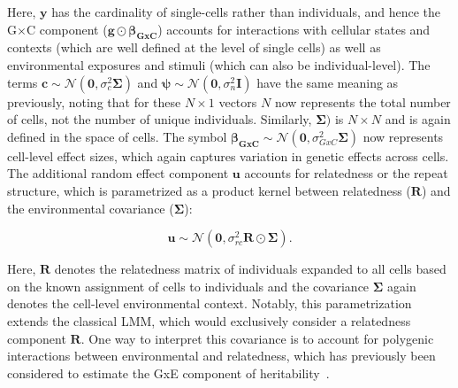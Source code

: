 Here, $\mathbf{y}$ has the cardinality of single-cells rather than individuals, and hence the G$\times$C component ($\mathbf{g} \odot \boldsymbol{\beta_{GxC}}$) accounts for interactions with cellular states and contexts (which are well defined at the level of single cells) as well as environmental exposures and stimuli (which can also be individual-level).
The terms $\mathbf{c} \sim \mathcal{N}(\mathbf{0},\sigma_c^2 \boldsymbol{\Sigma})$ and $\boldsymbol{\psi} \sim \mathcal{N}(\mathbf{0},\sigma_n^2\mathbf{I})$ have the same meaning as previously, noting that for these $N \times 1$ vectors $N$ now represents the total number of cells, not the number of unique individuals.
Similarly, $\boldsymbol{\Sigma})$ is $N \times N$ and is again defined in the space of cells.
The symbol $\boldsymbol{\beta_{GxC}}\sim \mathcal{N}(\mathbf{0},\sigma_{GxC}^2 \boldsymbol{\Sigma})$ now represents cell-level effect sizes, which again captures variation in genetic effects across cells.
The additional random effect component $\mathbf{u}$ accounts for relatedness or the repeat structure, which is parametrized as a product kernel between relatedness ($\mathbf{R}$) and the environmental covariance ($\boldsymbol{\Sigma}$):

\begin{equation}
    \mathbf{u} \sim \mathcal{N}(\mathbf{0},\sigma_{rc}^2 \mathbf{R} \odot \boldsymbol{\Sigma}).
\end{equation}

Here, $\mathbf{R}$ denotes the relatedness matrix of individuals expanded to all cells based on the known assignment of cells to individuals and the covariance $\mathbf{\Sigma}$ again denotes the cell-level environmental context.
Notably, this parametrization extends the classical LMM, which would exclusively consider a relatedness component $\mathbf{R}$.
One way to interpret this covariance is to account for polygenic interactions between environmental and relatedness, which has previously been considered to estimate the GxE component of heritability~\cite{heckerman2016linear}.


